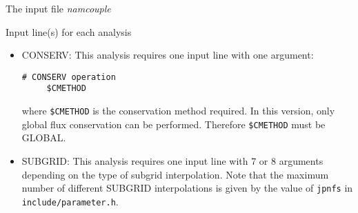 \begin{subsection}{The input file {\it namcouple}}
\begin{subsubsection}{Input line(s) for each analysis}
\begin{itemize}
\begin{enumerate}
\end{enumerate}
The parameters defining the smoothing are all initialized
in {\tt src/blkdata.f} and their definition is given in {\tt
include/smooth.h}. 

The smoothing band at the southern boundary is
defined by {\tt nsltb} (outermost point) and {\tt nslte} (innermost
point); the smoothing band at the northern boundary is
defined by {\tt nnltb} (outermost point) and {\tt nnlte} (innermost
point). The parameter {\tt qalfa} controls the weights given to the
regional and to the global fields in the linear interpolation. {\tt
qalfa} has to be $1/(nslte-nsltb)$ or $1/(nnltb-nnlte)$. For the 
outermost points ({\tt nsltb} or {\tt nnltb}) in the smoothing band, 
the weight given to the regional and global fields will respectively 
be 0 and 1; for the innermost points ({\tt nslte} or {\tt nnlte}) in
the smoothing band, 
the weight given to the regional and global fields will respectively 
be 1 and 0; within the smoothing band, the weights will be a linear 
interpolation of the outermost and innermost weights. 

The smoothing band at the western and eastern boundary will be a band
of {\tt nliss} points following the coastline. To calculate this band,
OASIS needs {\tt nwlgmx}, the longitude index of the eastest 
point on the western coastline and {\tt nelgmx}, the longitude index 
of the westest point on the eastern coastline.The parameter 
{\tt qbeta} controls the weights given to the
regional and to the global fields in the linear interpolation. {\tt
qbeta} has to be $1/(nliss-1)$. The weights given to the regional and
global fields in the smoothing bands will be calculated as for the 
southern and northern bands.  

\item CONSERV: This analysis requires one input line with one argument:
\begin{verbatim}
# CONSERV operation
     $CMETHOD
\end{verbatim}
where {\tt \$CMETHOD} is the conservation method required. In this
version, only global flux conservation can be performed. Therefore
{\tt \$CMETHOD} must be GLOBAL.
   
\item SUBGRID: This analysis requires one input line with 7 or 8
arguments depending on the type of subgrid interpolation. Note that
the maximum number of different SUBGRID interpolations is given by the
value of {\tt jpnfs} in {\tt include/parameter.h}.


\end{itemize}
\end{subsubsection}
\end{subsection}

